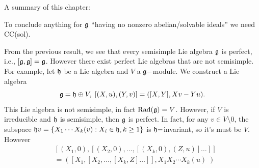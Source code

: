 A summary of this chapter:
\begin{center}
\end{center}
To conclude anything for $\mathfrak{g}$ ``having no nonzero abelian/solvable ideals'' we need CC(sol).

\begin{dang}
    \begin{remark}
        From the previous result, we see that every semisimple Lie algebra $\mathfrak{g}$ is perfect, i.e., 
        $[\mathfrak{g},\mathfrak{g}]=\mathfrak{g}$. However there exist perfect Lie algebras that are not semisimple. For example, let 
        $\mathfrak{h}$ be a Lie algebra and $V$ a $\mathfrak{g}-$module. We construct a Lie algebra
        \begin{equation}
            \mathfrak{g}=\mathfrak{h}\oplus V,\; [(X,u),(Y,v)]=([X,Y], Xv-Yu).
        \end{equation} 
        This Lie algebra is not semisimple, in fact $\text{Rad}(\mathfrak{g})=V$. However, if $V$ is irreducible and $\mathfrak{h}$ is semisimple,
         then $\mathfrak{g}$ is perfect. 
        In fact, for any $v\in V\setminus0$, the subspace 
        $\mathfrak{h}v=\{X_{1}\cdots X_{k}(v): X_{i}\in\mathfrak{h}, k\geq1\}$ is $\mathfrak{h}-$invariant, so it's must be $V$. However 
        \begin{equation}
            \begin{split}
            &[(X_{1},0),[(X_{2},0),\dots,[(X_{k},0),(Z,u)]\dots]]\\
            &=([X_{1},[X_{2},\dots,[X_{k},Z]\dots]],X_{1}X_{2}\cdots X_{k}(u)\;)
            \end{split}
        \end{equation}
    \end{remark}
\end{dang}



